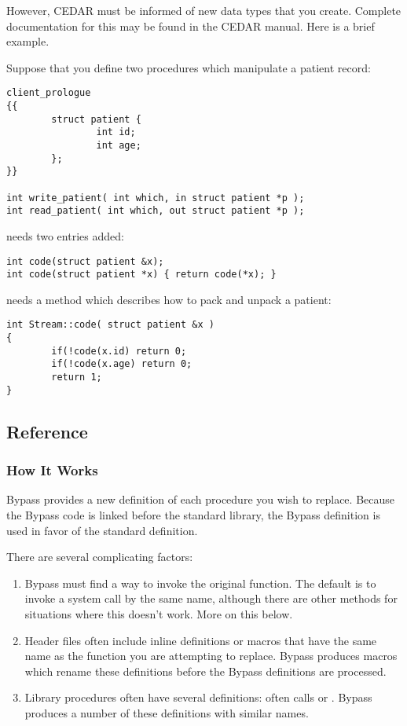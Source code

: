 However, CEDAR must be informed of new data types that you create.
Complete documentation for this may be found in the CEDAR manual.
Here is a brief example.

Suppose that you define two procedures which manipulate a patient record:

\begin{verbatim}
client_prologue
{{
        struct patient {
                int id;
                int age;
        };        
}}

int write_patient( int which, in struct patient *p );
int read_patient( int which, out struct patient *p );
\end{verbatim}

 needs two entries added:
\begin{verbatim}
int code(struct patient &x);
int code(struct patient *x) { return code(*x); }
\end{verbatim}

 needs a method which describes how to pack and unpack a patient:
\begin{verbatim}
int Stream::code( struct patient &x )
{
        if(!code(x.id) return 0;
        if(!code(x.age) return 0;
        return 1;
}
\end{verbatim}

\subsection{Reference}

\subsubsection{How It Works}

Bypass provides a new definition of each procedure you wish to replace.  Because the Bypass code is linked before the standard library, the Bypass definition is used in favor of the standard definition.

There are several complicating factors:
\begin{enumerate}
\item Bypass must find a way to invoke the original function.  The default is to invoke a system call by the same name, although there are other methods for situations where this doesn't work.  More on this below.
\item Header files often include inline definitions or macros that have the same name as the function you are attempting to replace.  Bypass produces macros which rename these definitions before the Bypass definitions are processed.
\item Library procedures often have several definitions:  often calls  or .  Bypass produces a number of these definitions with similar names.
\end{enumerate}

